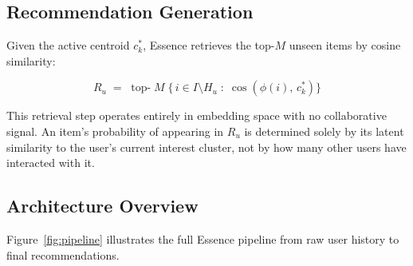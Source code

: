 \documentclass[11pt,a4paper]{article}
\begin{document}
\subsection{Recommendation Generation}
Given the active centroid $c_k^*$, Essence retrieves the top-$M$ unseen
items by cosine similarity:

\begin{equation}
  R_u \;=\; \operatorname{top-}M\;\bigl\{\, i \in I \setminus H_u \;:\;
  \cos\!\left(\phi(i),\, c_k^*\right) \bigr\}
  \label{eq:reco}
\end{equation}

This retrieval step operates entirely in embedding space with no collaborative
signal. An item's probability of appearing in $R_u$ is determined solely by
its latent similarity to the user's current interest cluster, not by how
many other users have interacted with it.

\subsection{Architecture Overview}

Figure~\ref{fig:pipeline} illustrates the full Essence pipeline from raw user
history to final recommendations.
\end{document}
